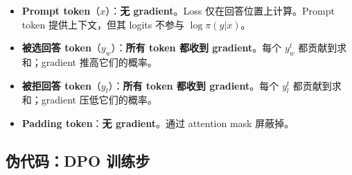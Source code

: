 \begin{keybox}
\begin{itemize}
  \item \textbf{Prompt token}（$x$）：\textbf{无 gradient}。Loss 仅在回答位置上计算。Prompt token 提供上下文，但其 logits 不参与 $\log\pi(y|x)$。
  \item \textbf{被选回答 token}（$y_w$）：\textbf{所有 token 都收到 gradient}。每个 $y_w^t$ 都贡献到求和；gradient 推高它们的概率。
  \item \textbf{被拒回答 token}（$y_l$）：\textbf{所有 token 都收到 gradient}。每个 $y_l^t$ 都贡献到求和；gradient 压低它们的概率。
  \item \textbf{Padding token}：\textbf{无 gradient}。通过 attention mask 屏蔽掉。
\end{itemize}
\end{keybox}

\subsection{伪代码：DPO 训练步}
\label{pseudocode-dpo-training-step}

